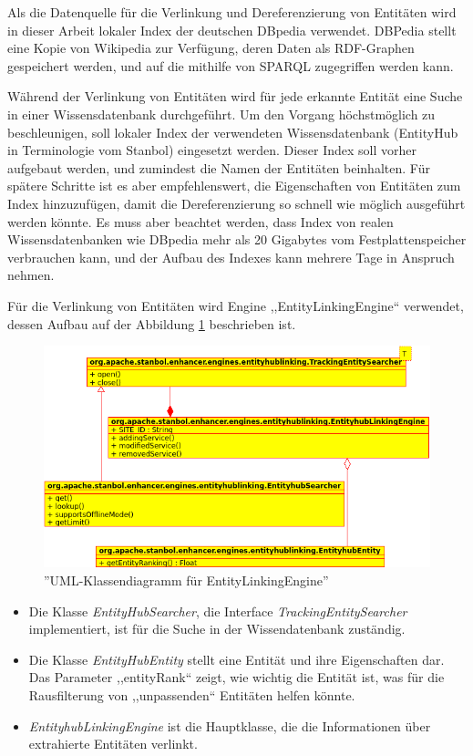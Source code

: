 Als die Datenquelle für die Verlinkung und Dereferenzierung von Entitäten wird in dieser Arbeit lokaler Index der deutschen DBpedia\cite{auer2007dbpedia} verwendet. DBPedia stellt eine Kopie von Wikipedia zur Verfügung, deren Daten als RDF-Graphen gespeichert werden, und auf die mithilfe von SPARQL zugegriffen werden kann.

Während der Verlinkung von Entitäten wird für jede erkannte Entität eine Suche in einer Wissensdatenbank durchgeführt. Um den Vorgang höchstmöglich zu beschleunigen, soll lokaler Index der verwendeten Wissensdatenbank (EntityHub in Terminologie vom Stanbol) eingesetzt werden. Dieser Index soll vorher aufgebaut werden, und zumindest die Namen der Entitäten beinhalten. Für spätere Schritte ist es aber empfehlenswert, die Eigenschaften von Entitäten zum Index hinzuzufügen, damit die Dereferenzierung so schnell wie möglich ausgeführt werden könnte. Es muss aber beachtet werden, dass Index von realen Wissensdatenbanken wie DBpedia mehr als 20 Gigabytes vom Festplattenspeicher verbrauchen kann, und der Aufbau des Indexes kann mehrere Tage in Anspruch nehmen.

Für die Verlinkung von Entitäten wird Engine ,,EntityLinkingEngine`` verwendet, dessen Aufbau auf der Abbildung \ref{fig:linking} beschrieben ist.

\begin{figure}[ht]
\centering
\includegraphics[width=\textwidth]{Bilder/classes-linking.png}
\caption{''UML-Klassendiagramm für EntityLinkingEngine''}
\label{fig:linking}
\end{figure}
\begin{itemize}
\item Die Klasse \textit{EntityHubSearcher}, die Interface \textit{TrackingEntitySearcher} implementiert, ist für die Suche in der Wissendatenbank zuständig.
\item Die Klasse \textit{EntityHubEntity} stellt eine Entität und ihre Eigenschaften dar. Das Parameter ,,entityRank`` zeigt, wie wichtig die Entität ist, was für die Rausfilterung von ,,unpassenden`` Entitäten helfen könnte.
\item \textit{EntityhubLinkingEngine} ist die Hauptklasse, die die Informationen über extrahierte Entitäten verlinkt.
\end{itemize}

